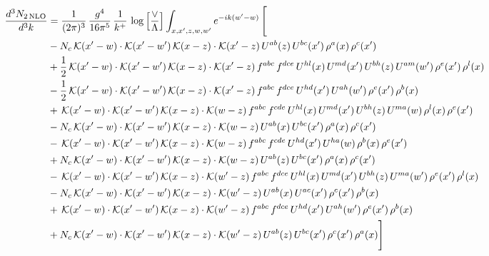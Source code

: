 \documentclass[9pt]{article}
\numberwithin{equation}{section}
\begin{document}
\begin{align}
\frac{d^{3}N_{2\,\mathrm{NLO}}}{d^{3}k} & = \frac{1}{(2\pi)^{3}}\,\frac{g^{4}}{16\pi^{5}}\,\frac{1}{k^{+}}\,\log\Big[\frac{\vee}{\Lambda}\Big]\int_{x,x',z,w,w'}e^{-ik(w'-w)}\,\Bigg[\notag\\ & -N_{c}\,\mathcal{K}(x'-w)\cdot\mathcal{K}(x'-w')\,\mathcal{K}(x-z)\cdot\mathcal{K}(x'-z)\,U^{ab}(z)\,U^{bc}(x')\,\rho^{a}(x)\,\rho^{c}(x')\notag\\
& +\frac{1}{2}\,\mathcal{K}(x'-w)\cdot\mathcal{K}(x'-w')\,\mathcal{K}(x-z)\cdot\mathcal{K}(x'-z)\,f^{abc}\,f^{dce}\,U^{hl}(x)\,U^{md}(x')\,U^{bh}(z)\,U^{am}(w')\,\rho^{e}(x')\,\rho^{l}(x)\notag\\
& -\frac{1}{2}\,\mathcal{K}(x'-w)\cdot\mathcal{K}(x'-w')\,\mathcal{K}(x-z)\cdot\mathcal{K}(x'-z)\,f^{abc}\,f^{dce}\,U^{hd}(x')\,U^{ah}(w')\,\rho^{e}(x')\,\rho^{b}(x)\notag\\
& +\,\mathcal{K}(x'-w)\cdot\mathcal{K}(x'-w')\,\mathcal{K}(x-z)\cdot\mathcal{K}(w-z)\,f^{abc}\,f^{cde}\,U^{hl}(x)\,U^{md}(x')\,U^{bh}(z)\,U^{ma}(w)\,\rho^{l}(x)\,\rho^{e}(x')\notag\\
& -N_{c}\,\mathcal{K}(x'-w)\cdot\mathcal{K}(x'-w')\,\mathcal{K}(x-z)\cdot\mathcal{K}(w-z)\,U^{ab}(x)\,U^{bc}(x')\,\rho^{a}(x)\,\rho^{c}(x')\notag\\
& -\,\mathcal{K}(x'-w)\cdot\mathcal{K}(x'-w')\,\mathcal{K}(x-z)\cdot\mathcal{K}(w-z)\,f^{abc}\,f^{cde}\,U^{hd}(x')\,U^{ha}(w)\,\rho^{b}(x)\,\rho^{e}(x')\notag\\
& +N_{c}\,\mathcal{K}(x'-w)\cdot\mathcal{K}(x'-w')\,\mathcal{K}(x-z)\cdot\mathcal{K}(w-z)\,U^{ab}(z)\,U^{bc}(x')\,\rho^{a}(x)\,\rho^{c}(x')\notag\\
& -\,\mathcal{K}(x'-w)\cdot\mathcal{K}(x'-w')\,\mathcal{K}(x-z)\cdot\mathcal{K}(w'-z)\,f^{abc}\,f^{dce}\,U^{hl}(x)\,U^{md}(x')\,U^{bh}(z)\,U^{ma}(w')\,\rho^{e}(x')\,\rho^{l}(x)\notag\\
& -N_{c}\,\mathcal{K}(x'-w)\cdot\mathcal{K}(x'-w')\,\mathcal{K}(x-z)\cdot\mathcal{K}(w'-z)\,U^{ab}(x)\,U^{ac}(x')\,\rho^{c}(x')\,\rho^{b}(x)\notag\\
& +\,\mathcal{K}(x'-w)\cdot\mathcal{K}(x'-w')\,\mathcal{K}(x-z)\cdot\mathcal{K}(w'-z)\,f^{abc}\,f^{dce}\,U^{hd}(x')\,U^{ah}(w')\,\rho^{e}(x')\,\rho^{b}(x)\notag\\
& +N_{c}\,\mathcal{K}(x'-w)\cdot\mathcal{K}(x'-w')\,\mathcal{K}(x-z)\cdot\mathcal{K}(w'-z)\,U^{ab}(z)\,U^{bc}(x')\,\rho^{c}(x')\,\rho^{a}(x)\Bigg]
\end{align}
\end{document}
